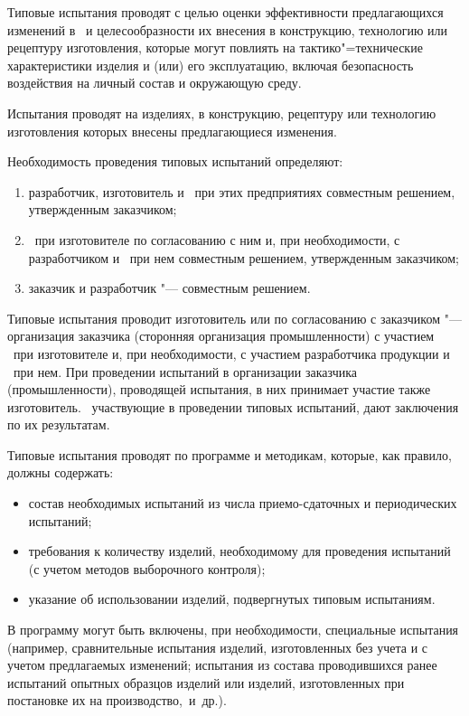 \point 
Типовые испытания проводят с целью оценки эффективности предлагающихся изменений в  \dut \  и целесообразности их внесения в конструкцию, технологию или рецептуру изготовления, которые могут повлиять на тактико"=технические характеристики изделия и (или) его эксплуатацию, включая безопасность воздействия на личный состав и окружающую среду.

Испытания проводят на изделиях, в конструкцию, рецептуру или технологию изготовления которых внесены предлагающиеся изменения.

Необходимость проведения типовых испытаний определяют:
%
\begin{enumerate}
	\item разработчик, изготовитель и \client \ при этих предприятиях совместным решением, утвержденным заказчиком;
	\item \client \ при изготовителе по согласованию с ним и, при необходимости, с разработчиком и \client \ при нем совместным решением, утвержденным заказчиком;
	\item заказчик и разработчик "--- совместным решением.
\end{enumerate}

\point 
Типовые испытания проводит изготовитель или по согласованию с заказчиком "--- организация заказчика (сторонняя организация промышленности) с участием \client \ при изготовителе и, при необходимости, с участием разработчика продукции и \client \ при нем. При проведении испытаний в организации заказчика (промышленности), проводящей испытания, в них принимает участие также изготовитель. \client \, участвующие в проведении типовых испытаний, дают заключения по их результатам.

\point 
Типовые испытания проводят по программе и методикам, которые, как правило, должны содержать:
%
\begin{itemize}
	\item состав необходимых испытаний из числа приемо-сдаточных и периодических испытаний;
	\item требования к количеству изделий, необходимому для проведения испытаний (с учетом методов выборочного контроля);
	\item указание об использовании изделий, подвергнутых типовым испытаниям.
\end{itemize}

В программу могут быть включены, при необходимости, специальные испытания (например, сравнительные испытания изделий, изготовленных без учета и с учетом предлагаемых изменений; испытания из состава проводившихся ранее испытаний опытных образцов изделий или изделий, изготовленных при постановке их на производство,~и~др.).

